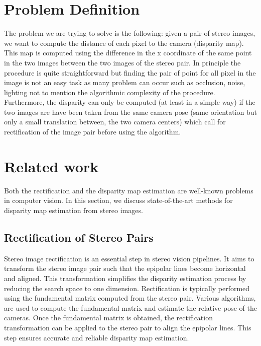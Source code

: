 \documentclass[10pt,twocolumn,letterpaper]{article}
\begin{document}
\section{Problem Definition}

The problem we are trying to solve is the following: given a pair of stereo images, we want to compute the distance of each pixel to the camera (disparity map). This map is computed using the difference in the x coordinate of the same point in the two images between the two images of the stereo pair. In principle the procedure is quite straightforward but finding the pair of point for all pixel in the image is not an easy task as many problem can occur such as occlusion, noise, lighting not to mention the algorithmic complexity of the procedure. Furthermore, the disparity can only be computed (at least in a simple way) if the two images are have been taken from the same camera pose (same orientation but only a small translation between, the two camera centers) which call for rectification of the image pair before using the algorithm. 


\section{Related work}
Both the rectification and the disparity map estimation are well-known problems in computer vision. In this section, we discuss state-of-the-art methods for disparity map estimation from stereo images.


\subsection{Rectification of Stereo Pairs}

Stereo image rectification is an essential step in stereo vision pipelines. It aims to transform the stereo image pair such that the epipolar lines become horizontal and aligned. This transformation simplifies the disparity estimation process by reducing the search space to one dimension. Rectification is typically performed using the fundamental matrix computed from the stereo pair. Various algorithms, are used to compute the fundamental matrix and estimate the relative pose of the cameras. Once the fundamental matrix is obtained, the rectification transformation can be applied to the stereo pair to align the epipolar lines. This step ensures accurate and reliable disparity map estimation.
\end{document}
